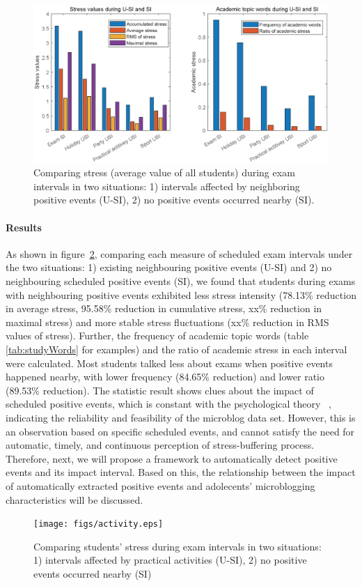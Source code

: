 \begin{figure}[h]
\centering
\includegraphics[width=\linewidth]{figs/barUSI.eps}
\caption{\small{Comparing stress (average value of all students) during exam intervals in two situations:
1) intervals affected by neighboring positive events (U-SI), 2) no positive events occurred nearby (SI).}}
\label{fig:frequency}
\end{figure}

\paragraph{Results}
As shown in figure~\ref{fig:frequency},
comparing each measure of scheduled exam intervals under the two situations:
1) existing neighbouring positive events (U-SI) and 2) no neighbouring scheduled positive events (SI),
we found that students during exams with neighbouring positive events exhibited less stress intensity
(78.13\% reduction in average stress, 95.58\%  reduction in cumulative stress, xx\%  reduction in maximal stress)
and more stable stress fluctuations (xx\% reduction in RMS values of stress).
Further, the frequency of academic topic words (table \ref{tab:studyWords} for examples)
and the ratio of academic stress in each interval were calculated.
Most students talked less about exams when positive events happened nearby,
with lower frequency (84.65\% reduction) and lower ratio (89.53\% reduction).
The statistic result shows clues about the impact of scheduled positive events,
which is constant with the psychological theory ~\citep{Cohen1984Positive, Cohen2010Positive, Needles1990Positive},
indicating the reliability and feasibility of the microblog data set.
However,
this is an observation based on specific scheduled events,
and cannot satisfy the need for automatic, timely, and continuous perception of stress-buffering process.
Therefore, next, we will propose a framework to automatically detect positive events and its impact interval.
Based on this,
the relationship between the impact of automatically extracted positive events
and adolecents' microblogging characteristics will be discussed.


\begin{figure}
\centering
\texttt{[image: figs/activity.eps]}
\caption{\small{Comparing students' stress during exam intervals in two situations:
1) intervals affected by practical activities (U-SI), 2) no positive events occurred nearby (SI)}}
\label{fig:frequency}
\end{figure}
